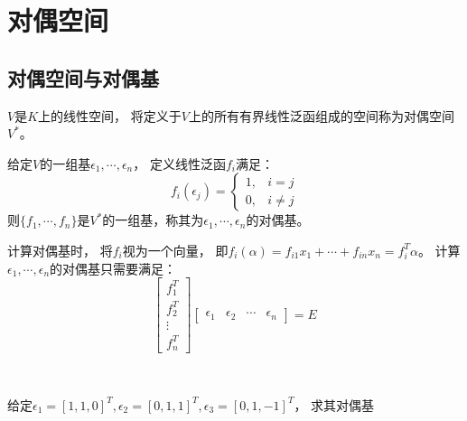 

\chapter{对偶空间}

\section{对偶空间与对偶基}

\begin{definition}[对偶空间]
  $V$是$K$上的线性空间，
  将定义于$V$上的所有有界线性泛函组成的空间称为对偶空间$V^{*}$。
\end{definition}

\begin{definition}[对偶基]
  给定$V$的一组基$\epsilon_1,\cdots,\epsilon_n$，
  定义线性泛函$f_i$满足：
  \begin{equation*}
    f_i(\epsilon_j) =
    \begin{cases}
      1, & i = j\\
      0, & i \neq j
    \end{cases}
  \end{equation*}
  则$\{f_1,\cdots,f_n\}$是$V^{*}$的一组基，称其为$\epsilon_1,\cdots,\epsilon_n$的对偶基。
\end{definition}

\begin{note}
  计算对偶基时，
  将$f_i$视为一个向量，
  即$f_i(\alpha) = f_{i1}x_1 + \cdots + f_{in}x_n = f_i^T \alpha$。
  计算$\epsilon_1, \cdots, \epsilon_n$的对偶基只需要满足：
  \begin{equation*}
    \left[
      \begin{array}{c}
        f_1^T\\
        f_2^T\\
        \vdots\\
        f_n^T
      \end{array}
    \right] \left[
      \begin{array}{cccc}
        \epsilon_1&\epsilon_2&\cdots&\epsilon_n
      \end{array}
    \right] = E
  \end{equation*}
\end{note}

~

\begin{exercise}
  给定$\epsilon_1 = [1,1,0]^T, \epsilon_2 = [0,1,1]^T, \epsilon_3 = [0,1,-1]^T$，
  求其对偶基
\end{exercise}

